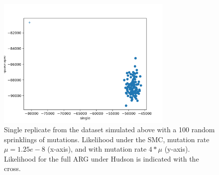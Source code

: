 \documentclass{article}
\begin{document}
\begin{figure}[!ht]
\centering
\includegraphics[width=0.75\textwidth]{figures/supplementary-figs/single_rep_human_like_1gb.png}
\caption{Single replicate from the dataset simulated above with a 100 random sprinklings of mutations. Likelihood under the SMC, mutation rate $\mu=1.25e-8$ (x-axis), and with mutation rate $4*\mu$ (y-axis). Likelihood for the full ARG under Hudson is indicated with the cross.}
 \label{sup:fig:single-tsinfer}
\end{figure}
\end{document}
